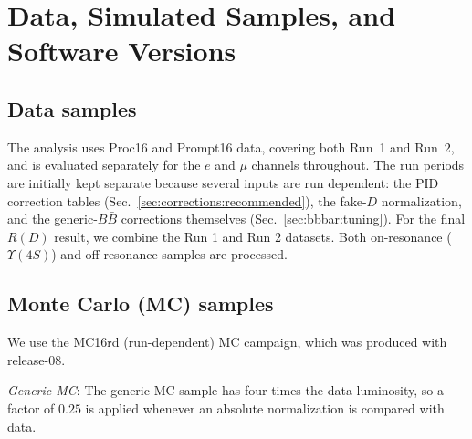 \section{Data, Simulated Samples, and Software Versions}
\label{sec:data}

\subsection{Data samples}
\label{sec:data:data}

The analysis uses Proc16 and Prompt16 data, covering both Run~1 and Run~2, and
is evaluated separately for the $e$ and $\mu$ channels throughout.
The run periods are initially kept separate because
several inputs are run dependent: the PID correction tables
(Sec.~\ref{sec:corrections:recommended}), the fake-$D$ normalization, and the
generic-$B\bar{B}$ corrections themselves (Sec.~\ref{sec:bbbar:tuning}).
For the final $R(D)$ result, we combine the Run 1 and Run 2 datasets.
Both on-resonance ($\Upsilon(4S)$) and off-resonance samples are processed.


\subsection{Monte Carlo (MC) samples}
\label{sec:data:mc}

We use the MC16rd (run-dependent) MC campaign, which was produced with release-08.

\emph{Generic MC}:
The generic MC sample has four
times the data luminosity, so a factor of $0.25$ is applied whenever an
absolute normalization is compared with data.

